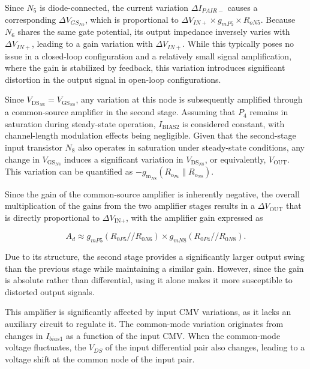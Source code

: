 \documentclass[12pt]{article}
\begin{document}
Since $N_5$ is diode-connected, the current variation $\Delta I_{PAIR-}$ causes a corresponding $\Delta V_{GS_{N5}}$, which is proportional to $\Delta V_{IN+} \times g_{mP5}  \times R_{oN5}$.  Because $N_6$ shares the same gate potential, its output impedance inversely varies with $\Delta V_{IN+}$,  leading to a gain variation with $\Delta V_{IN+}$. While this typically poses no issue in a closed-loop configuration and a relatively small signal amplification, where the gain is stabilized by feedback, this variation introduces significant distortion in the output signal in open-loop configurations.


Since \( V_{\text{DS}_{N6}} = V_{\text{GS}_{N8}} \), any variation at this node is subsequently amplified through a common-source amplifier in the second stage. Assuming that \( P_4 \) remains in saturation during steady-state operation, \( I_{\text{BIAS2}} \) is considered constant, with channel-length modulation effects being negligible. Given that the second-stage input transistor \( N_8 \) also operates in saturation under steady-state conditions, any change in \( V_{\text{GS}_{N8}} \) induces a significant variation in \( V_{\text{DS}_{N8}} \), or equivalently, \( V_{\text{OUT}} \).  This variation can be quantified as \( -g_{\text{m}_{N8}} \left( R_{\text{o}_{P4}} \parallel R_{\text{o}_{N8}} \right) \).

Since the gain of the common-source amplifier is inherently negative, the overall multiplication of the gains from the two amplifier stages results in a \(\Delta V_{\text{OUT}}\) that is directly proportional to \(\Delta V_{\text{IN+}}\), with the amplifier gain expressed as

\begin{equation}
A_d \approx  g_{mP5}(R_{0P5}//R_{0N6})\times g_{mN8}(R_{0P4}//R_{0N8}).
\label{gainnnn}
\end{equation}



Due to its structure, the second stage provides a significantly larger output swing than the previous stage while maintaining a similar gain. However, since the gain is absolute rather than differential, using it alone makes it more susceptible to distorted output signals. 


This amplifier is significantly affected by input CMV variations, as it lacks an auxiliary circuit to regulate it. The common-mode variation originates from changes in $I_{bias1}$ as a function of the input CMV. When the common-mode voltage fluctuates, the $V_{DS}$ of the input differential pair also changes, leading to a voltage shift at the common node of the input pair. 
\end{document}
